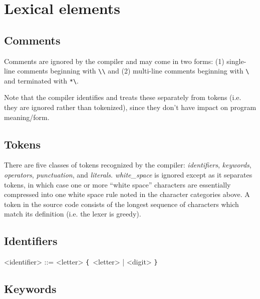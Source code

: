 \documentclass{article}
\def\lrep{\synshortsoff\texttt{\{}\synshorts~}
\def\rrep{\synshortsoff\texttt{\}}\synshorts~}
\begin{document}
\section*{Lexical elements}
\subsection*{Comments}
Comments are ignored by the compiler and may come in two forms: (1)
single-line comments beginning with
\texttt{\textbackslash\textbackslash} and (2) multi-line comments
beginning with \texttt{\textbackslash*} and terminated with
\texttt{*\textbackslash}.

Note that the compiler identifies and treats these separately from
tokens (i.e. they are ignored rather than tokenized), since they don't
have impact on program meaning/form.

\subsection*{Tokens}
There are five classes of tokens recognized by the compiler:
\emph{identifiers}, \emph{keywords}, \emph{operators},
\emph{punctuation}, and \emph{literals}. \emph{white\_space} is
ignored except as it separates tokens, in which case one or more
``white space'' characters are essentially compressed into one white
space rule noted in the character categories above. A token in the
source code consists of the longest sequence of characters which match
its definition (i.e. the lexer is greedy).


\subsection*{Identifiers}
\begin{grammar}
  <identifier> ::= <letter> \lrep <letter> | <digit> \rrep
\end{grammar}

\subsection*{Keywords}
\end{document}
